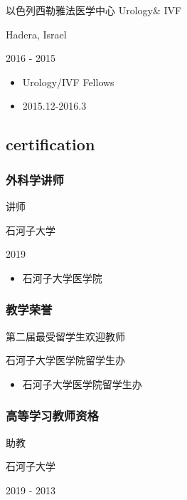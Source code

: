 \documentclass[]{article}
\providecommand{\tightlist}{%
  \setlength{\itemsep}{0pt}\setlength{\parskip}{0pt}}
\begin{document}
以色列西勒雅法医学中心 Urology\& IVF

Hadera, Israel

2016 - 2015

\begin{itemize}
\tightlist
\item
  Urology/IVF Fellows
\item
  2015.12-2016.3
\end{itemize}

\hypertarget{certification}{%
\subsection{certification}\label{certification}}

\hypertarget{ux5916ux79d1ux5b66ux8bb2ux5e08}{%
\subsubsection{外科学讲师}\label{ux5916ux79d1ux5b66ux8bb2ux5e08}}

讲师

石河子大学

2019

\begin{itemize}
\tightlist
\item
  石河子大学医学院
\end{itemize}

\hypertarget{ux6559ux5b66ux8363ux8a89}{%
\subsubsection{教学荣誉}\label{ux6559ux5b66ux8363ux8a89}}

第二届最受留学生欢迎教师

石河子大学医学院留学生办

\begin{itemize}
\tightlist
\item
  石河子大学医学院留学生办
\end{itemize}

\hypertarget{ux9ad8ux7b49ux5b66ux4e60ux6559ux5e08ux8d44ux683c}{%
\subsubsection{高等学习教师资格}\label{ux9ad8ux7b49ux5b66ux4e60ux6559ux5e08ux8d44ux683c}}

助教

石河子大学

2019 - 2013
\end{document}
